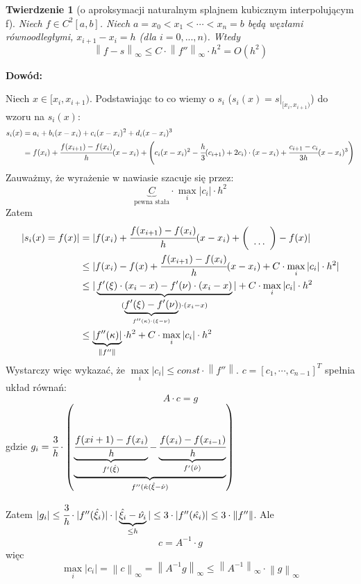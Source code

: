 \documentclass[hidelinks,a4paper,fleqn,oneside]{book}
\newcommand{\norm}[1]{\left\lVert#1\right\rVert}
\newtheorem{twierdz}{Twierdzenie}
\begin{document}
\begin{twierdz}[o aproksymacji naturalnym splajnem kubicznym interpolującym f] Niech $f \in C^2[a, b]$. Niech $a = x_0 < x_1 < \cdots < x_n = b$ będą węzłami równoodległymi, $x_{i+1} - x_i = h$ (dla $i=0, ..., n)$. Wtedy
\[
	\norm{f-s}_\infty \leq C \cdot \norm{f''}_\infty \cdot h^2 = O(h^2)
\]
\end{twierdz}

\textbf{Dowód:}

Niech $x \in [x_i, x_{i+1})$. Podstawiając to co wiemy o $s_i$ ($s_i(x) = s|_{[x_i, x_{i+1})}$) do wzoru na $s_i(x)$:
\begin{align*}
	s_i(x) & = a_i + b_i(x-x_i) + c_i(x-x_i)^2 + d_i(x-x_i)^3 \\
	& = f(x_i) + \cfrac{f(x_{i+1}) - f(x_i)}{h}(x-x_i) + \left( c_i(x-x_i)^2 - \cfrac{h}{3}(c_{i+1}) + 2c_i) \cdot (x-x_i) + \cfrac{c_{i+1} - c_i}{3h}(x-x_i)^3 \right)
\end{align*}
Zauważmy, że wyrażenie w nawiasie szacuje się przez:
\[
	\underbrace{C}_{\textrm{pewna stała}} \cdot \max\limits_{i}|c_i| \cdot h^2
\]
Zatem
\begin{align*}
	|s_i(x) = f(x)| & = |f(x_i) + \cfrac{f(x_{i+1}) - f(x_i)}{h}(x-x_i) + \left( \begin{array}{c}\\ \cdots \end{array} \right) - f(x)| \\
	& \leq |f(x_i) - f(x) + \cfrac{f(x_{i+1}) - f(x_i)}{h}(x-x_i) + C \cdot \max\limits_{i}|c_i| \cdot h^2| \\
	& \leq |\underbrace{f'(\xi) \cdot (x_i - x) - f'(\nu)\cdot(x_i-x)}_{(\underbrace{f'(\xi) - f'(\nu)}_{f''(\kappa) \cdot(\xi - \nu)})\cdot(x_i-x)}| + C \cdot \max\limits_i|c_i|\cdot h^2 \\
	& \leq \underbrace{|f''(\kappa)|}_{\norm{f''}} \cdot h^2 + C \cdot \max\limits_i |c_i| \cdot h^2
\end{align*}
Wystarczy więc wykazać, że $\max\limits_i |c_i| \leq const\cdot \norm{f''}$. $c = [c_1, \cdots, c_{n-1}]^T$ spełnia układ równań:
\[
	A \cdot c = g
\]
gdzie $g_i = \cfrac{3}{h} \cdot \left(\underbrace{\underbrace{\cfrac{f(x{i+1}) - f(x_i)}{h}}_{f'(\hat{\xi})} - \underbrace{\cfrac{f(x_i) - f(x_{i-1})}{h}}
_{f'(\hat{\nu})}}_{f''(\hat{\kappa}(\hat{\xi} - \hat{\nu})} \right)$

Zatem $|g_i| \leq \cfrac{3}{h} \cdot |f''(\hat{\xi_i})| \cdot |\underbrace{\hat{\xi_i} - \hat{\nu_i}}_{\leq h}| \leq 3 \cdot |f''(\hat{\kappa_i})| \leq 3 \cdot \norm{f''}$. Ale
\[
	c = A^{-1}\cdot g
\]
więc
\[
	\max\limits_i|c_i| = \norm{c}_\infty = \norm{A^{-1}g}_\infty \leq \norm{A^{-1}}_\infty \cdot \norm{g}_\infty
\]
\end{document}
